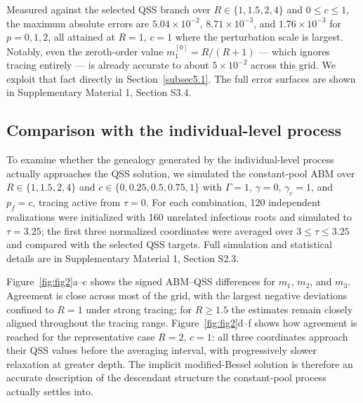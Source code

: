 \documentclass[review,12pt]{elsarticle}
\numberwithin{equation}{section}
\theoremstyle{remark}
\begin{document}
Measured against the selected QSS branch over $R\in\{1,1.5,2,4\}$ and $0\leq c\leq1$, the maximum absolute errors are $5.04\times10^{-2}$, $8.71\times10^{-3}$, and $1.76\times10^{-3}$ for $p=0,1,2$, all attained at $R=1$, $c=1$ where the perturbation scale is largest. Notably, even the zeroth-order value $m_1^{[0]}=R/(R+1)$ --- which ignores tracing entirely --- is already accurate to about $5\times10^{-2}$ across this grid. We exploit that fact directly in Section~\ref{subsec5.1}. The full error surfaces are shown in Supplementary Material 1, Section S3.4.

\subsection{Comparison with the individual-level process}\label{subsec3.3}

To examine whether the genealogy generated by the individual-level process actually approaches the QSS solution, we simulated the constant-pool ABM over $R\in\{1,1.5,2,4\}$ and $c\in\{0,0.25,0.5,0.75,1\}$ with $\Gamma=1$, $\gamma=0$, $\gamma_c=1$, and $p_f=c$, tracing active from $\tau=0$. For each combination, 120 independent realizations were initialized with 160 unrelated infectious roots and simulated to $\tau=3.25$; the first three normalized coordinates were averaged over $3\leq\tau\leq3.25$ and compared with the selected QSS targets. Full simulation and statistical details are in Supplementary Material 1, Section S2.3.

Figure~\ref{fig:fig2}a--c shows the signed ABM--QSS differences for $m_1$, $m_2$, and $m_3$. Agreement is close across most of the grid, with the largest negative deviations confined to $R=1$ under strong tracing; for $R\geq1.5$ the estimates remain closely aligned throughout the tracing range. Figure~\ref{fig:fig2}d--f shows how agreement is reached for the representative case $R=2$, $c=1$: all three coordinates approach their QSS values before the averaging interval, with progressively slower relaxation at greater depth. The implicit modified-Bessel solution is therefore an accurate description of the descendant structure the constant-pool process actually settles into.
\end{document}
